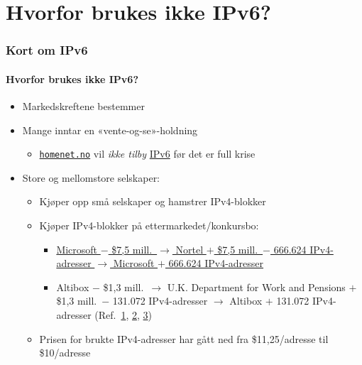 \section{Hvorfor brukes ikke IPv6?}
\begin{frame}
  \frametitle{Kort om IPv6}
  \framesubtitle{Hvorfor brukes ikke IPv6?}
  \begin{itemize}
  \item Markedskreftene bestemmer
  \item Mange inntar en «vente-og-se»-holdning
    \begin{itemize}
    \item \href{https://homenet.no/}{\texttt{homenet.no}} vil
      \textit{ikke tilby\/}
      \href{https://homenet.no/kundeservice/kundeservice_og_hjelp/teknisk/hva_betyr_egentlig_adsl__vdsl_og_andre_ord_som_vi_bruker_/har_dere_ikke_ipv6_}{IPv6}
      før det er full krise
    \end{itemize}
  \item Store og mellomstore selskaper:
    \begin{itemize}
    \item Kjøper opp små selskaper og hamstrer IPv4-blokker
    \item Kjøper IPv4-blokker på ettermarkedet/konkursbo:
      \begin{itemize}
      \item
        \href{http://www.computerworld.com/s/article/9215055/Microsoft_offers_7.5M_for_666_624_IPv4_addresses}{Microsoft
          \(-\) \$7,5 mill.\ \(\to\) Nortel \(+\) \$7,5 mill.\ \(-\) 666.624 IPv4-adresser \(\to\) Microsoft \(+\)
          666.624 IPv4-adresser}

      \item Altibox \(-\)
        \$1,3 mill.\ \(\to\)
        U.K. Department for Work and Pensions \(+\)
        \$1,3 mill.\ \(-\)
        131.072 IPv4-adresser \(\to\)
        Altibox \(+\) 131.072 IPv4-adresser
        (Ref.\
        \href{http://www.standard.difi.no/filearchive/samf-ok-analyse-ipv6-v0-8.pdf}{1},
        \href{http://www.digi.no/bedriftsteknologi/2015/05/26/altibox-kjoper-131.072-ip-adresser-fra-england}{2},
        \href{http://www.bbc.com/news/technology-32826353}{3})
      \end{itemize}
    \item Prisen for brukte IPv4-adresser har gått ned fra
      \$11,25/adresse til \$10/adresse
    \end{itemize}
  \end{itemize}
\end{frame}

